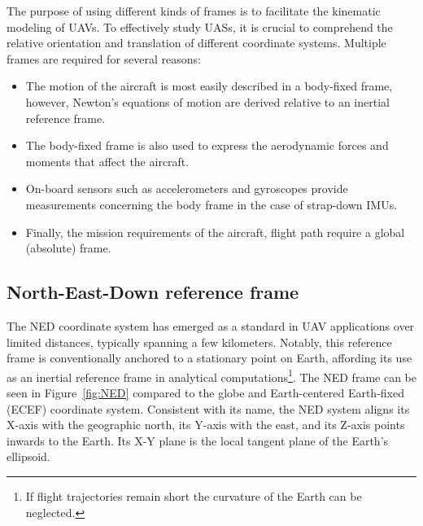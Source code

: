 The purpose of using different kinds of frames is to facilitate the kinematic modeling of UAVs. To effectively study UASs, it is crucial to comprehend the relative orientation and translation of different coordinate systems. Multiple frames are required for several reasons:
\begin{itemize}
    \item 
    The motion of the aircraft is most easily described in a body-fixed frame, however, Newton's equations of motion are derived relative to an inertial reference frame.
    \item 
    The body-fixed frame is also used to express the aerodynamic forces and moments that affect the aircraft.
    \item
    On-board sensors such as accelerometers and gyroscopes provide measurements concerning the body frame in the case of strap-down IMUs.
    \item 
    Finally, the mission requirements of the aircraft, \eg{} flight path require a global (absolute) frame.
\end{itemize}

\subsection{North-East-Down reference frame}

The NED coordinate system has emerged as a standard in UAV applications over limited distances, typically spanning a few kilometers. Notably, this reference frame is conventionally anchored to a stationary point on Earth, affording its use as an inertial reference frame in analytical computations\footnote{If flight trajectories remain short the curvature of the Earth can be neglected.}. The NED frame can be seen in Figure~\ref{fig:NED} compared to the globe and Earth-centered Earth-fixed (ECEF) coordinate system. Consistent with its name, the NED system aligns its X-axis with the geographic north, its Y-axis with the east, and its Z-axis points inwards to the Earth. Its X-Y plane is the local tangent plane of the Earth's ellipsoid.

